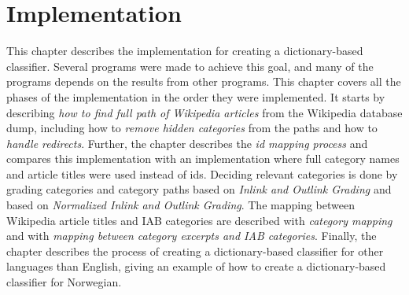 \chapter{Implementation}
This chapter describes the implementation for creating a dictionary-based classifier. Several programs were made to achieve this goal, and many of the programs depends on the results from other programs. This chapter covers all the phases of the implementation in the order they were implemented. It starts by describing \emph{how to find full path of Wikipedia articles} from the Wikipedia database dump, including how to \emph{remove hidden categories} from the paths and how to \emph{handle redirects}. Further, the chapter describes the \emph{id mapping process} and compares this implementation with an implementation where full category names and article titles were used instead of ids. Deciding relevant categories is done by grading categories and category paths based on \emph{Inlink and Outlink Grading} and based on \emph{Normalized Inlink and Outlink Grading}. The mapping between Wikipedia article titles and IAB categories are described with \emph{category mapping} and with \emph{mapping between category excerpts and IAB categories}. Finally, the chapter describes the process of creating a dictionary-based classifier for other languages than English, giving an example of how to create a dictionary-based classifier for Norwegian.









%
%











%

%
